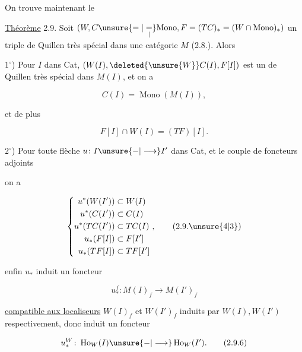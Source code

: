 
On trouve maintenant le

\uline{Théorème} 2.9. Soit $(W,C\unsure{=|\underset{\vert}{=}}\mathrm{Mono},F=(TC)_*=(W\cap\mathrm{Mono})_*)$
un triple de Quillen très spécial dans une
catégorie $M$ (2.8.). Alors 

$1^\circ$) Pour  $I$ dans Cat, $(W(I),\deleted{\unsure{W}}C(I),F[I])$
est un  de Quillen très spécial
dans $M(I)$, et on a 

\[
 C(I)=\operatorname{Mono}(M(I)),\tag*{(2.9.1)}
\]

et de plus

\[
 F[I]\cap W(I)=(TF)[I].\tag*{(2.9.2)}
\]

$2^\circ$) Pour toute flèche $u\colon I\unsure{-|\longrightarrow}I'$ dans Cat,
et  le couple de foncteurs adjoints


on a

\[
\left\{\begin{aligned}
 u^*(W(I'))&\subset W(I)\\
 u^*(C(I'))&\subset C(I)\\
 u^*(TC(I'))&\subset TC(I)\\
 u_*(F[I])&\subset F[I']\\
 u_*(TF[I])&\subset TF[I']
\end{aligned}\right.,\tag*{(2.9.\unsure{4|3})}
\]

enfin $u_*$ induit un foncteur

\[
 u_*^f\colon M(I)_f\longrightarrow M(I')_f\tag*{(2.9.5)}
\]


\uline{compatible aux localiseurs} $W(I)_f$ et $W(I')_f$
induits par $W(I),W(I')$ respectivement, donc
induit un foncteur

\[
 u_*^W\colon\operatorname{Ho}_W(I)\unsure{-|\longrightarrow}\operatorname{Ho}_W(I').\tag*{(2.9.6)}
\]

